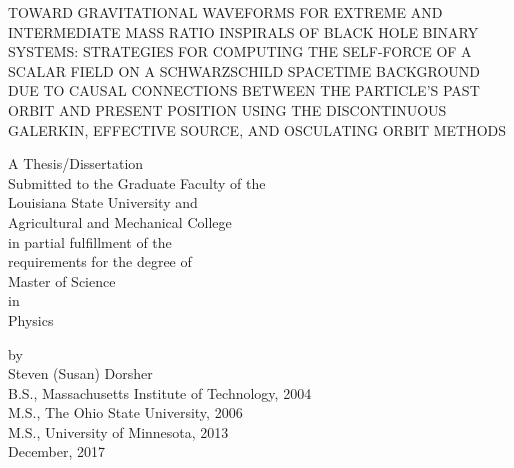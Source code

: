 \documentclass[12pt,letterpaper]{lsuetd}
\begin{document}
\renewcommand\@pnumwidth{1.55em}
\renewcommand\@tocrmarg{9.55em}
\renewcommand*\l@chapter{\@dottedtocline{0}{1.5em}{2.3em}}
\renewcommand*\l@figure{\@dottedtocline{1}{0em}{3.1em}}
\let\l@table\l@figure

\thispagestyle{empty}
\begin{center}
  TOWARD GRAVITATIONAL WAVEFORMS FOR EXTREME AND INTERMEDIATE MASS RATIO INSPIRALS OF BLACK HOLE BINARY SYSTEMS: STRATEGIES FOR COMPUTING THE SELF-FORCE OF A SCALAR FIELD ON A SCHWARZSCHILD SPACETIME BACKGROUND DUE TO CAUSAL CONNECTIONS BETWEEN THE PARTICLE'S PAST ORBIT AND PRESENT POSITION USING THE DISCONTINUOUS GALERKIN, EFFECTIVE SOURCE, AND OSCULATING ORBIT METHODS

\vfill
\doublespacing
A Thesis/Dissertation \\
\singlespacing
Submitted to the Graduate Faculty of the \\
Louisiana State University and \\
Agricultural and Mechanical College \\
in partial fulfillment of the \\
requirements for the degree of \\
Master of Science\\
\doublespacing
in \\
                                       
Physics\\
\singlespacing
\vfill

by \\
Steven (Susan) Dorsher \\
B.S., Massachusetts Institute of Technology, 2004  \\
M.S., The Ohio State University, 2006  \\
M.S., University of Minnesota, 2013  \\
December, 2017
\end{center}
\pagebreak

\end{document}
